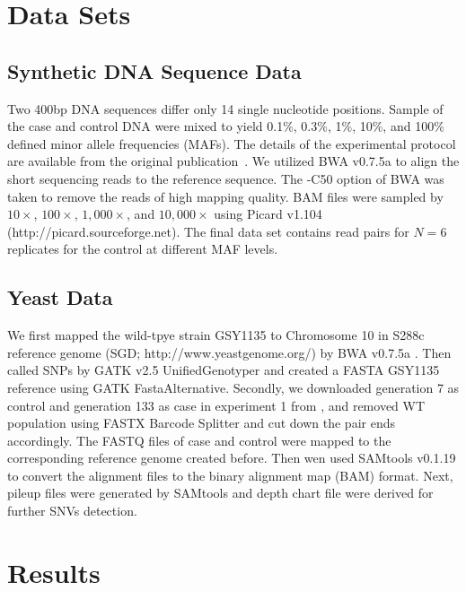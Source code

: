 \documentclass{bioinfo}
\begin{document}
\section{Data Sets}

\subsection{Synthetic DNA Sequence Data}

Two 400bp DNA sequences differ only 14 single nucleotide positions. Sample of the case and control DNA were mixed to yield 0.1\%, 0.3\%, 1\%, 10\%, and 100\% defined minor allele frequencies (MAFs).
The details of the experimental protocol are available from the original publication~\citep{Flaherty:2011ja}.
We utilized BWA v0.7.5a to align the short sequencing reads to the reference sequence. The -C50 option of BWA was taken to remove the reads of high mapping quality.
BAM files were sampled by $10\times$, $100\times$, $1,000\times$, and $10,000\times$ using Picard v1.104 (http://picard.sourceforge.net).
The final data set contains read pairs for $N=6$ replicates for the control at different MAF levels.

\subsection{Yeast Data}
We first mapped the wild-tpye strain GSY1135 \citep{kvitek2011reciprocal} to Chromosome 10 in S288c reference genome (SGD; http://www.yeastgenome.org/) by BWA v0.7.5a \citep{li2009fast}.
Then called SNPs by GATK v2.5 UnifiedGenotyper \citep{McKenna:2010bva, depristo2011framework} and created a FASTA GSY1135 reference using GATK FastaAlternative.
Secondly, we downloaded generation 7 as control and generation 133 as case in experiment 1 from \citep{kvitek2013whole}, and removed WT population using FASTX Barcode Splitter and cut down the pair ends accordingly.
The FASTQ files of case and control were mapped to the corresponding reference genome created before.
Then wen used SAMtools v0.1.19 \citep{li2009sequence} to convert the alignment files to the binary alignment map (BAM) format.
Next, pileup files were generated by SAMtools and depth chart file were derived for further SNVs detection.


\section{Results}
\end{document}
